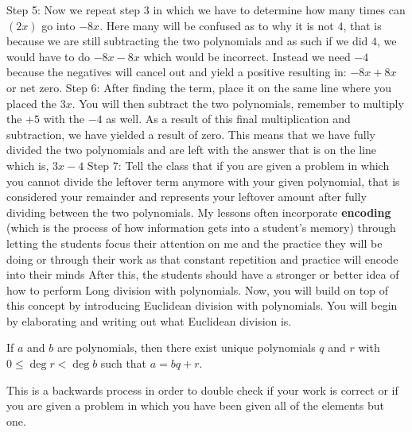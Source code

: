 \begin{outline}
        \2 Step 5: Now we repeat step 3 in which we have to determine how many times can $(2x)$ go into $-8x$. Here many will be confused as to why it is not $4$, that is because we are still subtracting the two polynomials and as such if we did $4$, we would have to do $-8x - 8x$ which would be incorrect. Instead we need $-4$ because the negatives will cancel out and yield a positive resulting in: $-8x + 8x$ or net zero. 
        \2 Step 6: After finding the term, place it on the same line where you placed the $3x$. You will then subtract the two polynomials, remember to multiply the  $+5$ with the $-4$ as well. As a result of this final multiplication and subtraction, we have yielded a result of zero. This means that we have fully divided the two polynomials and are left with the answer that is on the line which is, $3x-4$
        \2 Step 7: Tell the class that if you are given a problem in which you cannot divide the leftover term anymore with your given polynomial, that is considered your remainder and represents your leftover amount after fully dividing between the two polynomials. 
            \3 My lessons often incorporate \textbf{encoding} (which is the process of how information gets into a student's memory) through letting the students focus their attention on me and the practice they will be doing or through their work as that constant repetition and practice will encode into their minds
    \1 After this, the students should have a stronger or better idea of how to perform Long division with polynomials. Now, you will build on top of this concept by introducing Euclidean division with polynomials. You will begin by elaborating and writing out what Euclidean division is. 
    \begin{definition}
        If $a$ and $b$ are polynomials, then there exist unique polynomials $q$ and $r$ with $0 \le \deg r < \deg b$ such that $a = bq+r$.
    \end{definition}
    This is a backwards process in order to double check if your work is correct or if you are given a problem in which you have been given all of the elements but one.


\end{outline}
